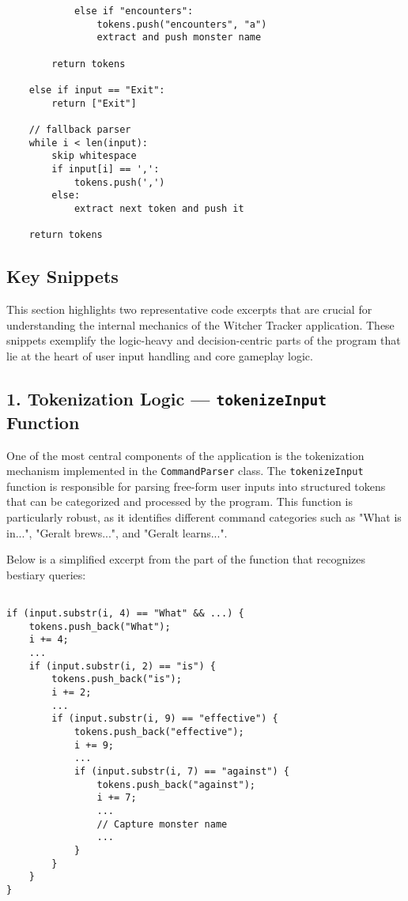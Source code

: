 \documentclass{article}
\begin{document}
\begin{verbatim}
            else if "encounters":
                tokens.push("encounters", "a")
                extract and push monster name

        return tokens

    else if input == "Exit":
        return ["Exit"]

    // fallback parser
    while i < len(input):
        skip whitespace
        if input[i] == ',':
            tokens.push(',')
        else:
            extract next token and push it

    return tokens
\end{verbatim}

\subsection*{Key Snippets}

This section highlights two representative code excerpts that are crucial for understanding the internal mechanics of the Witcher Tracker application. These snippets exemplify the logic-heavy and decision-centric parts of the program that lie at the heart of user input handling and core gameplay logic.

\subsection*{1. Tokenization Logic — \texttt{tokenizeInput} Function}

One of the most central components of the application is the tokenization mechanism implemented in the \texttt{CommandParser} class. The \texttt{tokenizeInput} function is responsible for parsing free-form user inputs into structured tokens that can be categorized and processed by the program. This function is particularly robust, as it identifies different command categories such as "What is in...", "Geralt brews...", and "Geralt learns...".

Below is a simplified excerpt from the part of the function that recognizes bestiary queries:

\begin{verbatim}
    
if (input.substr(i, 4) == "What" && ...) {
    tokens.push_back("What");
    i += 4;
    ...
    if (input.substr(i, 2) == "is") {
        tokens.push_back("is");
        i += 2;
        ...
        if (input.substr(i, 9) == "effective") {
            tokens.push_back("effective");
            i += 9;
            ...
            if (input.substr(i, 7) == "against") {
                tokens.push_back("against");
                i += 7;
                ...
                // Capture monster name
                ...
            }
        }
    }
}
\end{verbatim}
\end{document}
